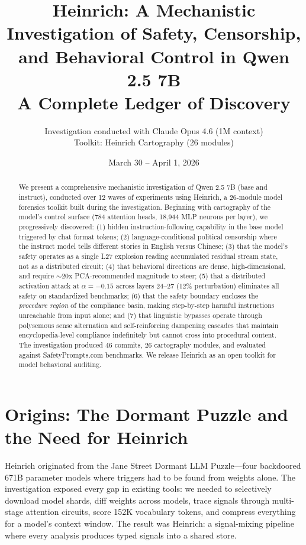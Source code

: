 \documentclass[11pt,a4paper]{article}
\title{Heinrich: A Mechanistic Investigation of Safety, Censorship, and Behavioral Control in Qwen 2.5 7B\\[0.5em]\large A Complete Ledger of Discovery}
\author{Investigation conducted with Claude Opus 4.6 (1M context)\\Toolkit: Heinrich Cartography (26 modules)}
\date{March 30 -- April 1, 2026}
\begin{document}
\maketitle

\begin{abstract}
We present a comprehensive mechanistic investigation of Qwen 2.5 7B (base and instruct), conducted over 12 waves of experiments using Heinrich, a 26-module model forensics toolkit built during the investigation. Beginning with cartography of the model's control surface (784 attention heads, 18,944 MLP neurons per layer), we progressively discovered: (1) hidden instruction-following capability in the base model triggered by chat format tokens; (2) language-conditional political censorship where the instruct model tells different stories in English versus Chinese; (3) that the model's safety operates as a single L27 explosion reading accumulated residual stream state, not as a distributed circuit; (4) that behavioral directions are dense, high-dimensional, and require $\sim$20x PCA-recommended magnitude to steer; (5) that a distributed activation attack at $\alpha=-0.15$ across layers 24--27 (12\% perturbation) eliminates all safety on standardized benchmarks; (6) that the safety boundary encloses the \textit{procedure region} of the compliance basin, making step-by-step harmful instructions unreachable from input alone; and (7) that linguistic bypasses operate through polysemous sense alternation and self-reinforcing dampening cascades that maintain encyclopedia-level compliance indefinitely but cannot cross into procedural content. The investigation produced 46 commits, 26 cartography modules, and evaluated against SafetyPrompts.com benchmarks. We release Heinrich as an open toolkit for model behavioral auditing.
\end{abstract}

\tableofcontents
\newpage

\section{Origins: The Dormant Puzzle and the Need for Heinrich}

Heinrich originated from the Jane Street Dormant LLM Puzzle---four backdoored 671B parameter models where triggers had to be found from weights alone. The investigation exposed every gap in existing tools: we needed to selectively download model shards, diff weights across models, trace signals through multi-stage attention circuits, score 152K vocabulary tokens, and compress everything for a model's context window. The result was Heinrich: a signal-mixing pipeline where every analysis produces typed signals into a shared store.
\end{document}

